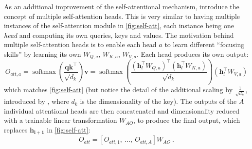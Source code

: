\documentclass[bsc,frontabs,twoside,singlespacing,parskip,deptreport]{infthesis}
\DeclareMathOperator{\softmax}{softmax}
\begin{document}
{{{      %
      As an additional improvement of the self-attentional mechanism, \citeauthor{Vaswani_2017} introduce the concept of multiple self-attention heads. This is very similar to having multiple instances of the self-attention module in \autoref{fig:self-att}, each instance being one \textit{head} and computing its own queries, keys and values. The motivation behind multiple self-attention heads is to enable each head $a$ to learn different ``focusing skills'' by learning its own $W_{Q,a}$, $W_{K,a}$, $W_{V,a}$. Each head produces its own output:
      \begin{equation}
      O_{att,a} = \softmax(\frac{\bm{q}\bm{k}^\top}{\sqrt{d_k}})\bm{v} = \softmax(\frac{(\bm{h}_l^\top{W_{Q,a}})^\top(\bm{h}_l^\top{W_{K,a}})}{\sqrt{d_k}})(\bm{h}_l^\top{W_{V,a}})
      \end{equation}
      which matches \autoref{fig:self-att} (but notice the detail of the additional scaling by $\frac{1}{\sqrt{d_k}}$, introduced by \citeauthor{Vaswani_2017}, where $d_k$ is the dimensionality of the key).
      The outputs of the $A$ individual attentional heads are then concatenated and dimensionality reduced with a trainable linear transformation $W_{AO}$, to produce the final output, which replaces $\bm{h_{l+1}}$ in \autoref{fig:self-att}:
      \begin{equation}
      O_{att} = [O_{att, 1},\ \ldots,\ O_{att, A}]W_{AO}\ .
      \end{equation}
      
}}}
\end{document}
